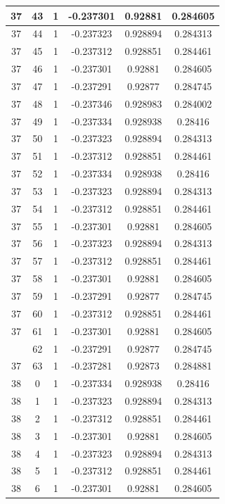 \documentclass[12pt,a4paper]{article}
\numberwithin{equation}{section}
\numberwithin{figure}{section}
\numberwithin{table}{section}
\begin{document}
\begin{longtable}{|c|c|c|c|c|c|}
37 & 43 & 1 & -0.237301 & 0.92881 & 0.284605 \\ \hline
37 & 44 & 1 & -0.237323 & 0.928894 & 0.284313 \\ \hline
37 & 45 & 1 & -0.237312 & 0.928851 & 0.284461 \\ \hline
37 & 46 & 1 & -0.237301 & 0.92881 & 0.284605 \\ \hline
37 & 47 & 1 & -0.237291 & 0.92877 & 0.284745 \\ \hline
37 & 48 & 1 & -0.237346 & 0.928983 & 0.284002 \\ \hline
37 & 49 & 1 & -0.237334 & 0.928938 & 0.28416 \\ \hline
37 & 50 & 1 & -0.237323 & 0.928894 & 0.284313 \\ \hline
37 & 51 & 1 & -0.237312 & 0.928851 & 0.284461 \\ \hline
37 & 52 & 1 & -0.237334 & 0.928938 & 0.28416 \\ \hline
37 & 53 & 1 & -0.237323 & 0.928894 & 0.284313 \\ \hline
37 & 54 & 1 & -0.237312 & 0.928851 & 0.284461 \\ \hline
37 & 55 & 1 & -0.237301 & 0.92881 & 0.284605 \\ \hline
37 & 56 & 1 & -0.237323 & 0.928894 & 0.284313 \\ \hline
37 & 57 & 1 & -0.237312 & 0.928851 & 0.284461 \\ \hline
37 & 58 & 1 & -0.237301 & 0.92881 & 0.284605 \\ \hline
37 & 59 & 1 & -0.237291 & 0.92877 & 0.284745 \\ \hline
37 & 60 & 1 & -0.237312 & 0.928851 & 0.284461 \\ \hline
37 & 61 & 1 & -0.237301 & 0.92881 & 0.284605 \\ \hline
\pagebreak
37 & 62 & 1 & -0.237291 & 0.92877 & 0.284745 \\ \hline
37 & 63 & 1 & -0.237281 & 0.92873 & 0.284881 \\ \hline
38 & 0 & 1 & -0.237334 & 0.928938 & 0.28416 \\ \hline
38 & 1 & 1 & -0.237323 & 0.928894 & 0.284313 \\ \hline
38 & 2 & 1 & -0.237312 & 0.928851 & 0.284461 \\ \hline
38 & 3 & 1 & -0.237301 & 0.92881 & 0.284605 \\ \hline
38 & 4 & 1 & -0.237323 & 0.928894 & 0.284313 \\ \hline
38 & 5 & 1 & -0.237312 & 0.928851 & 0.284461 \\ \hline
38 & 6 & 1 & -0.237301 & 0.92881 & 0.284605 \\ \hline

\end{longtable}
\end{document}
